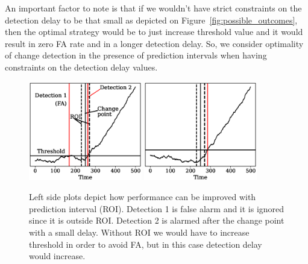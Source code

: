 An important factor to note is that if we wouldn't have strict constraints on the detection delay to be that small as depicted on Figure~\ref{fig:possible_outcomes}, then the optimal strategy would be to just increase threshold value and it would result in zero FA rate and in a longer detection delay.
So, we consider optimality of change detection in the presence of prediction intervals when having constraints on the detection delay values.
\begin{figure}[!htb]
	\begin{minipage}[t]{1.0\textwidth}
    \centering
    \includegraphics[width=0.44\textwidth, trim={1.5cm 1.0cm 0.3cm 1.0cm}]{articles/pics/journal_paper/proof_of_concept2.eps}
    \includegraphics[width=0.44\textwidth, trim={1.5cm 1.0cm 0.3cm 1.0cm}]{articles/pics/journal_paper/proof_of_concept2_fn_case.eps}
    \\
		
    \hspace{10mm}
		
		\caption{
    Left side plots depict how performance can be improved with prediction interval (ROI). 
    Detection 1 is false alarm and it is ignored since it is outside ROI. 
    Detection 2 is alarmed after the change point with a small delay. 
    Without ROI we would have to increase threshold in order to avoid FA, but in this case detection delay would increase.
}
\end{minipage}
\end{figure}
